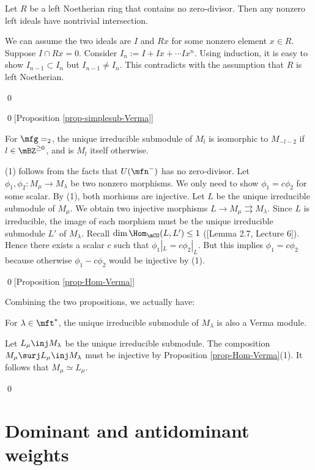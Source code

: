 	\begin{lem}
		Let $R$ be a left Noetherian ring that contains no zero-divisor. Then any nonzero left ideals have nontrivial intersection.
	\end{lem}
	
	\proof
		We can assume the two ideals are $I$ and $Rx$ for some nonzero element $x\in R$. Suppose $I\cap Rx =0$. Consider $I_n:= I + Ix +\cdots Ix^n$. Using induction, it is easy to show $I_{n-1}\subset I_n$ but $I_{n-1}\neq I_n$. This contradicts with the assumption that $R$ is left Noetherian.

	\qed

\qed[Proposition \ref{prop-simplesub-Verma}]

\begin{exam}
	For $\mfg=\sl_2$, the unique irreducible submodule of $M_l$ is isomorphic to $M_{-l-2}$ if $l\in \mBZ^{\ge 0}$, and is $M_l$ itself otherwise.
\end{exam}

	(1) follows from the facts that $U(\mfn^-)$ has no zero-divisor. Let $\phi_1,\phi_2:M_\mu \to M_\lambda$ be two nonzero morphisms. We only need to show $\phi_1 = c\phi_2$ for some scalar. By (1), both morhisms are injective. Let $L$ be the unique irreducible submodule of $M_\mu$. We obtain two injective morphisms $L \to M_\mu \rightrightarrows M_\lambda$. Since $L$ is irreducible, the image of each morphism must be the unique irreducible submodule $L'$ of $M_\lambda$. Recall $\dim \Hom_\mCO(L,L')\le 1$ ([Lemma 2.7, Lecture 6]). Hence there exists a scalar $c$ such that $\phi_1|_L = c\phi_2|_L$. But this implies $\phi_1 = c\phi_2$ because otherwise $\phi_1 - c\phi_2$ would be injective by (1).

\qed[Proposition \ref{prop-Hom-Verma}]

Combining the two propositions, we actually have:

\begin{cor}
	For $\lambda \in \mft^*$, the unique irreducible submodule of $M_\lambda$ is also a Verma module.
\end{cor}

\proof
	Let $L_\mu \inj M_\lambda$ be the unique irreducible submodule. The composition $M_\mu \surj L_\mu \inj M_\lambda$ must be injective by Proposition \ref{prop-Hom-Verma}(1). It follows that $M_\mu\simeq L_\mu$.

\qed



\section{Dominant and antidominant weights}

